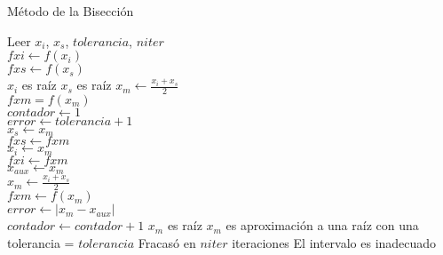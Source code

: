 \documentclass[12pt]{article}
\begin{document}
\begin{algorithm}[H]
	
	\caption{Método de la Bisección}
	\SetAlgoLined
	Leer $x_i$, $x_s$, $tolerancia$, $niter$ \\
	$fxi \leftarrow f(x_i)$ \\
	$fxs \leftarrow f(x_s)$ \\
	{$x_i$ es raíz}
	{$x_s$ es raíz}
	{
		$x_m \leftarrow \frac{x_i + x_s}{2}$\\
		$fxm = f(x_m)$\\
		$contador \leftarrow 1$\\
		$error \leftarrow tolerancia + 1$ \\
		{
			{$x_s \leftarrow x_m$\\
			$fxs \leftarrow fxm$\\}
			{$x_i \leftarrow x_m$\\
			$fxi \leftarrow fxm$\\}
			$x_{aux} \leftarrow x_m$\\
			$x_m \leftarrow \frac{x_i + x_s}{2}$\\
			$fxm \leftarrow f(x_m)$\\
			$error \leftarrow |x_m - x_{aux}|$\\
			$contador \leftarrow contador + 1$
		}
		{$x_m$ es raíz}
		{$x_m$ es aproximación a una raíz con una tolerancia = $tolerancia$}
		\Else
		{Fracasó en $niter$ iteraciones}
	}
	\Else
	{El intervalo es inadecuado}
\end{algorithm}
\end{document}
